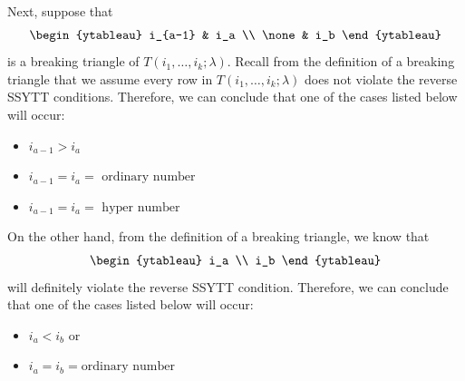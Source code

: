 \documentclass[12pt,reqno,a4paper]{amsart}
\numberwithin{equation}{section}
\theoremstyle{definition}
\begin{document}
Next, suppose that 
\begin{align}
	\begin{ytableau}
		i_{a-1} & i_a
		\\
		\none & i_b
	\end{ytableau}
\end{align}
is a breaking triangle of $T(i_1,\dots,i_k;\lambda)$. Recall from the definition of a breaking triangle that we assume every row in $T(i_1,\dots,i_k;\lambda)$ does not violate the reverse SSYTT conditions. Therefore, we can conclude that one of the cases listed below will occur:
\begin{itemize}
	\item $i_{a-1} > i_a$
	\item $i_{a-1} = i_a = \text{ ordinary number }$
	\item $i_{a-1} = i_a = \text{ hyper number }$
\end{itemize}
On the other hand, from the definition of a breaking triangle, we know that 
\begin{align}
	\begin{ytableau}
		i_a
		\\
		i_b
	\end{ytableau}
\end{align}
will definitely violate the reverse SSYTT condition. Therefore, we can conclude that one of the cases listed below will occur:
\begin{itemize}
	\item $i_a < i_b$ or
	\item  $i_a = i_b = \text{ordinary number}$ 
\end{itemize}
\end{document}
